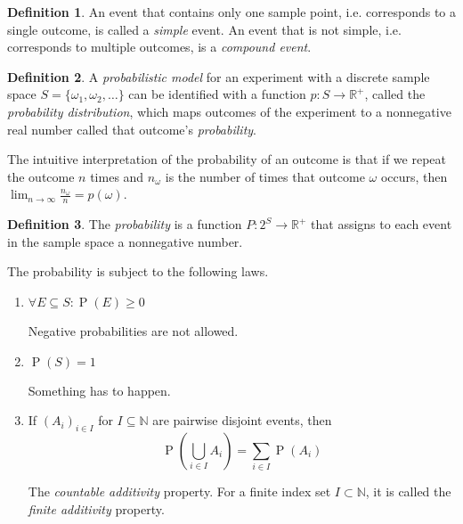 \documentclass[11pt,letterpaper]{article}
\theoremstyle{definition}
\newtheorem{defn}{Definition}[section]
\theoremstyle{remark}
\newcommand{\parens}[1]{\left(#1\right)}
\newcommand{\Union}{\bigcup}
\newcommand{\R}{\mathbb{R}}
\newcommand{\N}{\mathbb{N}}
\DeclareMathOperator{\Prob}{P}
\renewcommand{\P}[1]{\Prob{\parens{#1}}}
\begin{document}
\begin{defn}
    An event that contains only one sample point, i.e. corresponds to a single
    outcome, is called a \emph{simple} event. An event that is not simple, i.e.
    corresponds to multiple outcomes, is a \emph{compound event}.
\end{defn}

\begin{defn}
    A \emph{probabilistic model} for an experiment with a discrete sample space
    $S = \{\omega_1, \omega_2, \ldots\}$
    can be identified with a function $p : S \to \R^+$, called the
    \emph{probability distribution}, which maps outcomes of the experiment to a
    nonnegative real number called that outcome's \emph{probability}.
\end{defn}

The intuitive interpretation of the probability of an outcome is that if we
repeat the outcome $n$ times and $n_\omega$ is the number of times that outcome
$\omega$ occurs, then $\lim_{n\to\infty} \frac{n_\omega}{n} = p(\omega)$.

\begin{defn}
    The \emph{probability} is a function $P : 2^S \to \R^+$ that assigns to
    each event in the sample space a nonnegative number.

    The probability is subject to the following laws.

    \begin{enumerate}
        \item $\forall E \subseteq S : \P{E} \geq 0$

            Negative probabilities are not allowed.

        \item $\P{S} = 1$

            Something has to happen.

        \item If $(A_i)_{i\in I}$ for $I \subseteq \N$ are pairwise disjoint
            events, then
            \begin{equation}
                \P{\Union_{i \in I} A_i} = \sum_{i \in I} \P{A_i}
                \label{eq:countable-additivity}
            \end{equation}

            The \emph{countable additivity} property. For a finite index set
            $I \subset \N$, it is called the \emph{finite additivity} property.
    \end{enumerate}
\end{defn}
\end{document}
